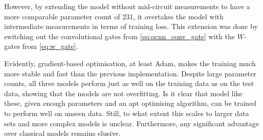 However, by extending the model without mid-circuit measurements to have a more comparable parameter count of 231, it overtakes the model with intermediate measurements in terms of training loss.
This extension was done by switching out the convolutional gates from \cref{eq:qcnn_conv_gate} with the $W$-gates from \cref{eq:w_gate}.

Evidently, gradient-based optimisation, at least Adam, makes the training much more stable and fast than the previous implementation.
Despite large parameter counts, all three models perform just as well on the training data as on the test data, showing that the models are not overfitting.
Is it clear that model like these, given enough parameters and an apt optimising algorithm, can be trained to perform well on unseen data.
Still, to what extent this scales to larger data sets and more complex models is unclear.
Furthermore, any significant advantage over classical models remains elusive.

